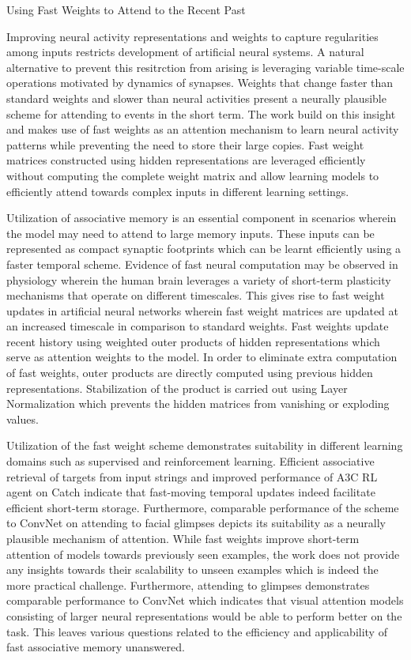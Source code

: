 \documentclass[11pt,letterpaper]{article}
\begin{document}
\begin{center}
  \large{Using Fast Weights to Attend to the Recent Past}
\end{center}

Improving neural activity representations and weights to capture regularities among inputs restricts development of artificial neural systems. A natural alternative to prevent this resitrction from arising is leveraging variable time-scale operations motivated by dynamics of synapses. Weights that change faster than standard weights and slower than neural activities present a neurally plausible scheme for attending to events in the short term. The work build on this insight and makes use of fast weights as an attention mechanism to learn neural activity patterns while preventing the need to store their large copies. Fast weight matrices constructed using hidden representations are leveraged efficiently without computing the complete weight matrix and allow learning models to efficiently attend towards complex inputs in different learning settings.

Utilization of associative memory is an essential component in scenarios wherein the model may need to attend to large memory inputs. These inputs can be represented as compact synaptic footprints which can be learnt efficiently using a faster temporal scheme. Evidence of fast neural computation may be observed in physiology wherein the human brain leverages a variety of short-term plasticity mechanisms that operate on different timescales. This gives rise to fast weight updates in artificial neural networks wherein fast weight matrices are updated at an increased timescale in comparison to standard weights. Fast weights update recent history using weighted outer products of hidden representations which serve as attention weights to the model. In order to eliminate extra computation of fast weights, outer products are directly computed using previous hidden representations. Stabilization of the product is carried out using Layer Normalization which prevents the hidden matrices from vanishing or exploding values. 

Utilization of the fast weight scheme demonstrates suitability in different learning domains such as supervised and reinforcement learning. Efficient associative retrieval of targets from input strings and improved performance of A3C RL agent on Catch indicate that fast-moving temporal updates indeed facilitate efficient short-term storage. Furthermore, comparable performance of the scheme to ConvNet on attending to facial glimpses depicts its suitability as a neurally plausible mechanism of attention. While fast weights improve short-term attention of models towards previously seen examples, the work does not provide any insights towards their scalability to unseen examples which is indeed the more practical challenge. Furthermore, attending to glimpses demonstrates comparable performance to ConvNet which indicates that visual attention models consisting of larger neural representations would be able to perform better on the task. This leaves various questions related to the efficiency and applicability of fast associative memory unanswered. 
\end{document}
